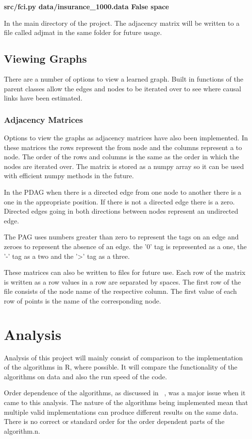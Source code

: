 \documentclass{UoYCSproject}
\begin{document}
\textbf{src/fci.py data/insurance\_1000.data False space}

In the main directory of the project. The adjacency matrix will be written to a file called adjmat in the same folder for future usage.
 
\section{Viewing Graphs}
There are a number of options to view a learned graph. Built in functions of the parent classes allow the edges and nodes to be iterated over to see where causal links have been estimated.

\subsection{Adjacency Matrices}
Options to view the graphs as adjacency matrices have also been implemented. In these matrices the rows represent the from node and the columns represent a to node. The order of the rows and columns is the same as the order in which the nodes are iterated over. The matrix is stored as a numpy array so it can be used with efficient numpy methods in the future.

In the PDAG when there is a directed edge from one node to another there is a one in the appropriate position. If there is not a directed edge there is a zero. Directed edges going in both directions between nodes represent an undirected edge.
 
The PAG uses numbers greater than zero to represent the tags on an edge and zeroes to represent the absence of an edge. the '0' tag is represented as a one, the '-' tag as a two and the '>' tag as a three.

These matrices can also be written to files for future use. Each row of the matrix is written as a row values in a row are separated by spaces. The first row of the file consists of the node name of the respective column. The first value of each row of points is the name of the corresponding node.

\chapter{Analysis}
Analysis of this project will mainly consist of comparison to the implementation of the algorithms in R, where possible. It will compare the functionality of the algorithms on data and also the run speed of the code. 

Order dependence of the algorithms, as discussed in ~\parencite{colombo2014order}, was a major issue when it came to this analysis. The nature of the algorithms being implemented mean that multiple valid implementations can produce different results on the same data. There is no correct or standard order for the order dependent parts of the algorithm.n.
\end{document}
